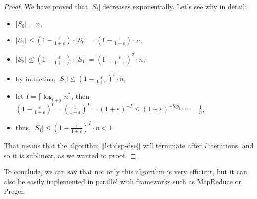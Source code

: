 \begin{proof}
    We have proved that $|S_i|$ decreases exponentially. Let's see why in detail:
    \begin{itemize}
        \item $|S_0| = n$,
        \item $|S_1| \leq \left(1 - \frac{\varepsilon}{1+\varepsilon}\right) \cdot |S_0| = \left(1 - \frac{\varepsilon}{1+\varepsilon}\right) \cdot n$,
        \item $|S_2| \leq \left(1 - \frac{\varepsilon}{1+\varepsilon}\right) \cdot |S_1| = \left(1 - \frac{\varepsilon}{1+\varepsilon}\right)^2 \cdot n$,
        \item by induction, $|S_i| \leq \left(1 - \frac{\varepsilon}{1+\varepsilon}\right)^i \cdot n$,
        \item let $I = \lceil \log_{i+\varepsilon} n \rceil$, then $\left(1 - \frac{\varepsilon}{1+\varepsilon}\right)^I = \left( \frac{1}{1 + \varepsilon} \right)^I = (1+\varepsilon)^{-I} \leq (1+\varepsilon)^{-log_{1+\varepsilon n}} = \frac{1}{n}$,
        \item thus, $|S_I| \leq \left(1 - \frac{\varepsilon}{1+\varepsilon}\right)^I \cdot n < 1$.
    \end{itemize}
    That means that the algorithm [\ref{lst:dsp-dse}] will terminate after $I$ iterations, and so it is sublinear, as we wanted to proof.
\end{proof}

To conclude, we can say that not only this algorithm is very efficient, but it can also be easily implemented in parallel with frameworks such as MapReduce or Pregel.
